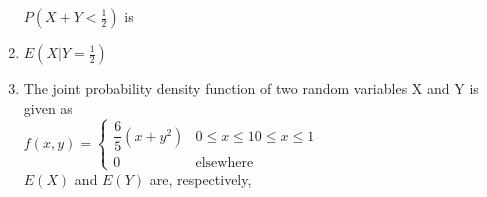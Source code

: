 \begin{enumerate}[label=\thesection.\arabic*.,ref=\thesection.\theenumi]
            $P(X+Y<\frac{1}{2})$ is
            
            \begin{enumerate}
            \end{enumerate}
            \solution
            
            
            \item $E(X|Y=\frac{1}{2})$
            
            \begin{enumerate}
            \end{enumerate}
            \solution
                    


            \item The joint probability density function of two random variables X and Y is given as \\
            $
            f(x,y)=
            \begin{cases}
            \dfrac{6}{5}(x+y^2)
            & 0 \leqslant x \leqslant 1  0 \leqslant x \leqslant 1 \\
            0 & \text{elsewhere}
            \end{cases}
            $\\
            $E(X)$ and $E(Y)$ are, respectively,
            
            \begin{enumerate}
            \begin{multicols}{2}
            \setlength\itemsep{2em}
            

\end{multicols}
\end{enumerate}
\end{enumerate}
